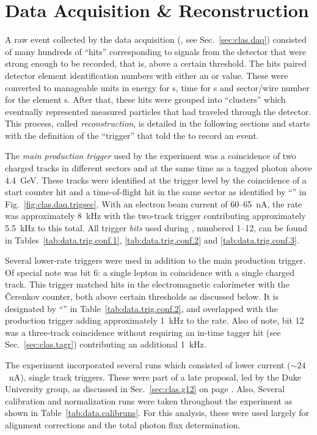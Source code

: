 \setcounter{chapter}{1}
\chapter{\label{sec:data} Data Acquisition \& Reconstruction}

A raw event collected by the data acquisition (, see Sec.~\ref{sec:clas.daq}) consisted of many hundreds of ``hits'' corresponding to signals from the detector that were strong enough to be recorded, that is, above a certain threshold. The hits paired detector element identification numbers with either an  or  value. These were converted to manageable units in energy for s, time for s and sector/wire number for the element s. After that, these hits were grouped into ``clusters'' which eventually represented measured particles that had traveled through the detector. This process, called \emph{reconstruction}, is detailed in the following sections and starts with the definition of the ``trigger'' that told the  to record an event.

The \emph{main production trigger} used by the  experiment was a coincidence of two charged tracks in different sectors and at the same time as a tagged photon above 4.4~GeV. These tracks were identified at the trigger level by the coincidence of a start counter hit and a time-of-flight hit in the same sector as identified by ``'' in Fig.~\ref{fig:clas.daq.trigsec}. With an electron beam current of 60--65~nA, the  rate was approximately 8~kHz with the two-track trigger contributing approximately 5.5~kHz to this total. All trigger \emph{bits} used during , numbered 1--12, can be found in Tables~\ref{tab:data.trig.conf.1}, \ref{tab:data.trig.conf.2} and \ref{tab:data.trig.conf.3}.

Several lower-rate triggers were used in addition to the main production trigger. Of special note was bit 6: a single lepton in coincidence with a single charged track. This trigger matched hits in the electromagnetic calorimeter with the \v{C}erenkov counter, both above certain thresholds as discussed below. It is designated by ``'' in Table~\ref{tab:data.trig.conf.2}, and overlapped with the production trigger adding approximately 1~kHz to the  rate. Also of note, bit 12 was a three-track coincidence without requiring an in-time tagger hit (see Sec.~\ref{sec:clas.tagr}) contributing an additional 1~kHz.

The  experiment incorporated several runs which consisted of lower current ($\sim24$~nA), single track triggers. These were part of a late proposal\cite{clas.proposal.pion}, led by the Duke University group, as discussed in Sec.~\ref{sec:clas.g12} on page \pageref{sec:clas.g12}. Also, Several calibration and normalization runs were taken throughout the experiment as shown in Table~\ref{tab:data.calibruns}. For this analysis, these were used largely for alignment corrections and the total photon flux determination.

